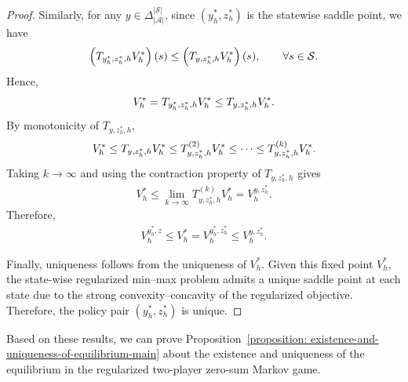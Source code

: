 \documentclass{article}
\theoremstyle{plain}
\theoremstyle{definition}
\theoremstyle{remark}
\def\cA{\mathcal A}
\def\cS{\mathcal S}
\begin{document}
\begin{proof}
    Similarly, for any $y\in\Delta_{|\cA|}^{|\cS|}$, since
    $(y_h^*,z_h^*)$ is the statewise saddle point, we have
    \begin{align}
        \left(T_{y_h^*,z_h^*,h}V_h^*\right)(s)
        \le
        \left(T_{y,z_h^*,h}V_h^*\right)(s),
        \qquad \forall s\in\cS .\notag
    \end{align}
    Hence,
    \begin{align}
        V_h^*
        =
        T_{y_h^*,z_h^*,h}V_h^*
        \le
        T_{y,z_h^*,h}V_h^* .\notag
    \end{align}
    By monotonicity of $T_{y,z_h^*,h}$,
    \begin{align}
        V_h^*
        \le
        T_{y,z_h^*,h}V_h^*
        \le
        T_{y,z_h^*,h}^{(2)}V_h^*
        \le
        \cdots
        \le
        T_{y,z_h^*,h}^{(k)}V_h^* . \notag
    \end{align}
    Taking $k\to\infty$ and using the contraction property of
    $T_{y,z_h^*,h}$ gives
    \begin{align}
        V_h^*
        \le
        \lim_{k\to\infty}
        T_{y,z_h^*,h}^{(k)}V_h^*
        =
        V_h^{y,z_h^*}.
    \end{align}
    Therefore,
    \begin{align}
        V_h^{y_h^*,z}
        \le
        V_h^*
        =
        V_h^{y_h^*,z_h^*}
        \le
        V_h^{y,z_h^*}. 
    \end{align}

Finally, uniqueness follows from the uniqueness of $V_h^*$. Given this
fixed point $V_h^*$, the state-wise regularized min--max problem admits a
unique saddle point at each state due to the strong convexity--concavity of
the regularized objective. Therefore, the policy pair $(y_h^*, z_h^*)$ is
unique.
\end{proof}

Based on these results, we can prove Proposition~\ref{proposition: existence-and-uniqueness-of-equilibrium-main} about the existence and uniqueness of the equilibrium in the regularized two-player zero-sum Markov game.
\end{document}
